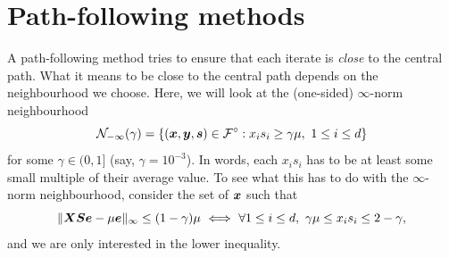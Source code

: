 \section{Path-following methods}
A path-following method tries to ensure that each iterate is {\em close} to the central path. What it means to be close to the central path depends on the neighbourhood we choose. Here, we will look at the (one-sided) $\infty$-norm neighbourhood
\begin{equation*}
\mathcal{N}_{-\infty}(\gamma) = \{(\bm{x},\bm{y},\bm{s})\in \mathcal{F}^{\circ} \mathrel{\mathop{:}} x_is_i\geq \gamma \mu, \ 1\leq i\leq d\}
\end{equation*}
for some $\gamma\in (0,1]$ (say, $\gamma=10^{-3}$). In words, each $x_is_i$ has to be at least some small multiple of their average value. To see what this has to do with the $\infty$-norm neighbourhood, consider the set of $\bm{x}$ such that
\begin{equation*}
 \norm{\mtx{X}\mtx{S}\vct{e}-\mu \vct{e}}_\infty \leq (1-\gamma) \mu \ \Longleftrightarrow \ \forall 1\leq i\leq d, \ \gamma \mu \leq x_is_i \leq 2-\gamma,
\end{equation*}
and we are only interested in the lower inequality.

